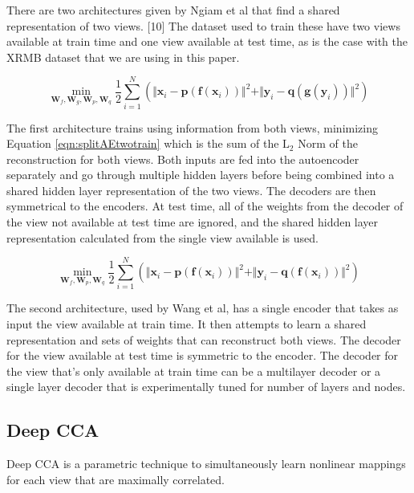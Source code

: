 \documentclass{article} %
\begin{document}
There are two architectures given by Ngiam et al that find a shared representation of two views. [10] The dataset used to train these have two views available at train time and one view available at test time, as is the case with the XRMB dataset that we are using in this paper.

\begin{equation}
\min_{\mathbf{W}_f, \mathbf{W}_g, \mathbf{W}_p, \mathbf{W}_q} \frac{1}{2} \sum\limits_{i=1}^N (\Vert \mathbf{x}_i - \mathbf{p}(\mathbf{f}(\mathbf{x}_i)) \Vert^2 + \Vert \mathbf{y}_i - \mathbf{q}(\mathbf{g}(\mathbf{y}_i)) \Vert^2)
\label{eqn:splitAEtwotrain}
\end{equation}

The first architecture trains using information from both views, minimizing Equation \ref{eqn:splitAEtwotrain} which is the sum of the $\text{L}_2$ Norm of the reconstruction for both views. Both inputs are fed into the autoencoder separately and go through multiple hidden layers before being combined into a shared hidden layer representation of the two views. The decoders are then symmetrical to the encoders. At test time, all of the weights from the decoder of the view not available at test time are ignored, and the shared hidden layer representation calculated from the single view available is used.

\begin{equation}
\min_{\mathbf{W}_f, \mathbf{W}_p, \mathbf{W}_q} \frac{1}{2} \sum\limits_{i=1}^N (\Vert \mathbf{x}_i - \mathbf{p}(\mathbf{f}(\mathbf{x}_i)) \Vert^2 + \Vert \mathbf{y}_i - \mathbf{q}(\mathbf{f}(\mathbf{x}_i)) \Vert^2)
\label{eqn:splitAEonetrain}
\end{equation}

The second architecture, used by Wang et al, has a single encoder that takes as input the view available at train time. It then attempts to learn a shared representation and sets of weights that can reconstruct both views. The decoder for the view available at test time is symmetric to the encoder. The decoder for the view that's only available at train time can be a multilayer decoder or a single layer decoder that is experimentally tuned for number of layers and nodes.

\subsection{Deep CCA}

Deep CCA is a parametric technique to simultaneously learn nonlinear mappings for each view that are maximally correlated. 
\end{document}
